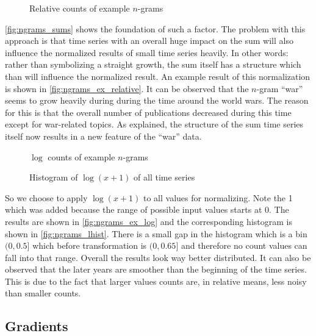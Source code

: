 \begin{figure}
    \centering
    
    \caption{Relative counts of example $n$-grams}\label{fig:ngrams_ex_relative}
\end{figure}

\autoref{fig:ngrams_sums} shows the foundation of such a factor. The problem with this approach is that time series with an overall huge impact on the sum will also influence the normalized results of small time series heavily. In other words: rather than symbolizing a straight growth, the sum itself has a structure which than will influence the normalized result. An example result of this normalization is shown in \autoref{fig:ngrams_ex_relative}. It can be observed that the $n$-gram \enquote{war} seems to grow heavily during during the time around the world wars. The reason for this is that the overall number of publications decreased during this time except for war-related topics. As explained, the structure of the sum time series itself now results in a new feature of the \enquote{war} data.

\begin{figure}
    \centering
    
    \caption{$\log$ counts of example $n$-grams}\label{fig:ngrams_ex_log}
\end{figure}

\begin{figure}
    \centering
    
    \caption{Histogram of $\log(x + 1)$ of all time series}\label{fig:ngrams_lhist}
\end{figure}

So we choose to apply $\log(x + 1)$ to all values for normalizing. Note the \num{1} which was added because the range of possible input values starts at \num{0}. The results are shown in \autoref{fig:ngrams_ex_log} and the corresponding histogram is shown in \autoref{fig:ngrams_lhist}. There is a small gap in the histogram which is a bin $(0,0.5]$ which before transformation is $(0,0.65]$ and therefore no count values can fall into that range. Overall the results look way better distributed. It can also be observed that the later years are smoother than the beginning of the time series. This is due to the fact that larger values counts are, in relative means, less noisy than smaller counts.


\subsection{Gradients}
\label{ssec:baseline:sim:grad}

